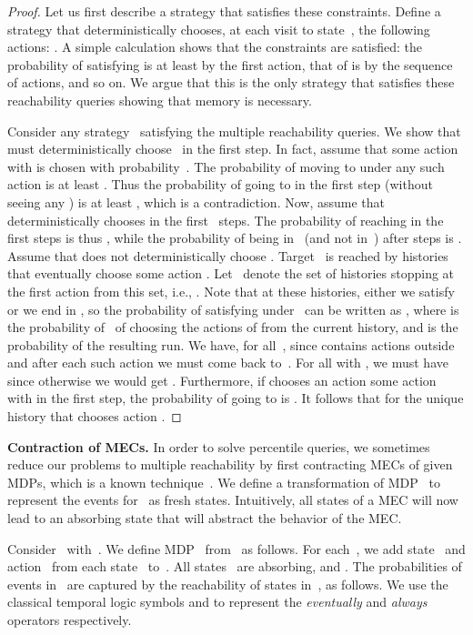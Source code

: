 \documentclass{llncs}
\begin{document}
\begin{proof}
Let us first describe a strategy that satisfies these constraints.
Define a strategy that deterministically
chooses, at each visit to state~, the following actions: . A simple calculation
shows that the constraints are satisfied: the probability of satisfying  is at least  by the first action,
that of  is  by the sequence  of actions, and so on.
We argue that this is the only strategy that satisfies these reachability queries showing that  memory is necessary.

Consider any strategy~ satisfying the multiple reachability queries. We show that  must deterministically choose~ in the first step.
In fact, assume that some action~ with  is chosen with probability~. The probability of moving to  under any such action is at least
. Thus the probability of going to  in the first step (without seeing any ) is at least
, which is a contradiction.
Now, assume that  deterministically chooses  in the first~ steps. The probability of reaching  in the first  steps is thus ,
while the probability of being in~ (and not in~) after  steps is .
Assume that  does not deterministically choose .
Target~ is reached by histories that eventually choose some action . Let~ denote the set of histories
stopping at the first action from this set, i.e.,
.
Note that at these histories, either we satisfy  or we end in , so the probability of satisfying  under~ can be written as
, where  is the probability of~ of choosing the actions of  from the current history,
and  is the probability of the resulting run.
We have, for all~,  since 
 contains  actions outside  and  after each such action 
we must come back to~.
For all  with , we must have  since otherwise we would get .
Furthermore, if  chooses an action some action~ with  in the first step, the probability of going to 
is . It follows that  for the unique history that chooses action .
\end{proof}


\smallskip\noindent\textbf{Contraction of MECs.} In order to solve percentile queries, we sometimes reduce our problems to multiple reachability by first contracting MECs of given MDPs,
which is a known technique~\cite{DeAlfaro-phd97}. We define a transformation of MDP~ to represent the events  for~
as fresh states. Intuitively, all states of a MEC will now lead to an absorbing state that will abstract the behavior of the MEC.

Consider~ with~. We define MDP~ from~ as follows. For each~, we add state~ and action~ from each state~ to~.
All states~ are absorbing, and . 
The probabilities of events  in~ are captured by the reachability of states  in~, as follows. We use the classical temporal logic symbols  and  to represent the \textit{eventually} and \textit{always} operators respectively.
\end{document}
